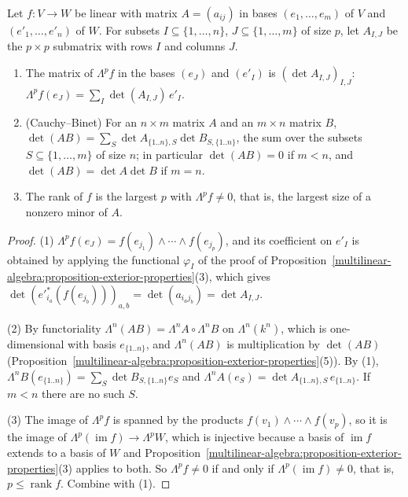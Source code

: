 \begin{proposition}\label{multilinear-algebra:proposition-minors}
Let $f \colon V \to W$ be linear with matrix $A = (a_{ij})$ in bases $(e_1, \ldots, e_m)$ of $V$ and $(e'_1, \ldots, e'_n)$ of $W$. For subsets $I \subseteq \{1, \ldots, n\}$, $J \subseteq \{1, \ldots, m\}$ of size $p$, let
$A_{I,J}$ be the $p \times p$ submatrix with rows $I$ and columns $J$.
\begin{enumerate}
\item The matrix of $\Lambda^pf$ in the bases $(e_J)$ and $(e'_I)$ is $(\det A_{I,J})_{I,J}$: $\Lambda^pf(e_J) = \sum_I\det(A_{I,J})\,e'_I$.
\item (Cauchy--Binet) For an $n \times m$ matrix $A$ and an $m \times n$ matrix $B$, $\det(AB) = \sum_S\det A_{\{1..n\},S}\det B_{S,\{1..n\}}$, the sum over the subsets $S \subseteq \{1, \ldots, m\}$ of size $n$; in
particular $\det(AB) = 0$ if $m < n$, and $\det(AB) = \det A\det B$ if $m = n$.
\item The rank of $f$ is the largest $p$ with $\Lambda^pf \neq 0$, that is, the largest size of a nonzero minor of $A$.
\end{enumerate}
\end{proposition}

\begin{proof}
(1) $\Lambda^pf(e_J) = f(e_{j_1}) \wedge \cdots \wedge f(e_{j_p})$, and its coefficient on $e'_I$ is obtained by applying the functional $\varphi_I$ of the proof of
Proposition~\ref{multilinear-algebra:proposition-exterior-properties}(3), which gives $\det(e'^*_{i_a}(f(e_{j_b})))_{a,b} = \det(a_{i_aj_b}) = \det A_{I,J}$.

(2) By functoriality $\Lambda^n(AB) = \Lambda^nA \circ \Lambda^nB$ on $\Lambda^n(k^n)$, which is one-dimensional with basis $e_{\{1..n\}}$, and $\Lambda^n(AB)$ is multiplication by $\det(AB)$
(Proposition~\ref{multilinear-algebra:proposition-exterior-properties}(5)). By (1), $\Lambda^nB(e_{\{1..n\}}) = \sum_S\det B_{S,\{1..n\}}e_S$ and $\Lambda^nA(e_S) = \det A_{\{1..n\},S}\,e_{\{1..n\}}$. If $m < n$ there are
no such $S$.

(3) The image of $\Lambda^pf$ is spanned by the products $f(v_1) \wedge \cdots \wedge f(v_p)$, so it is the image of $\Lambda^p(\operatorname{im}f) \to \Lambda^pW$, which is injective because a basis of $\operatorname{im}f$ extends
to a basis of $W$ and Proposition~\ref{multilinear-algebra:proposition-exterior-properties}(3) applies to both. So $\Lambda^pf \neq 0$ if and only if $\Lambda^p(\operatorname{im}f) \neq 0$, that is, $p \leq \operatorname{rank}f$.
Combine with (1).
\end{proof}

